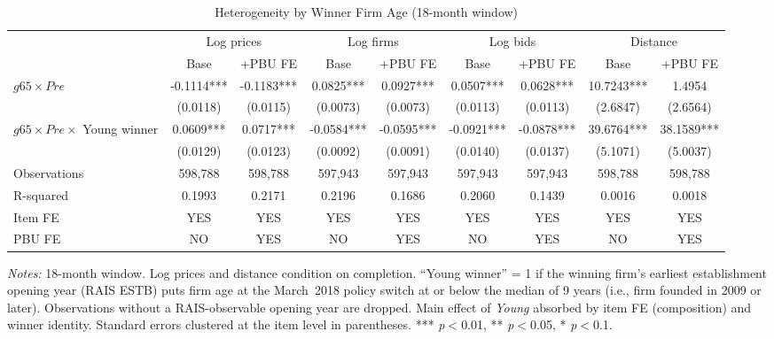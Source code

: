 \begin{table}[htbp]
\centering
\caption{Heterogeneity by Winner Firm Age (18-month window)}
\label{tab:firm_age}
\begin{adjustbox}{max width=\textwidth}
\begin{threeparttable}
\small
\begin{tabular}{lcccccccc}
\toprule
 & \multicolumn{2}{c}{Log prices} & \multicolumn{2}{c}{Log firms}
 & \multicolumn{2}{c}{Log bids} & \multicolumn{2}{c}{Distance} \\
\cmidrule(lr){2-3} \cmidrule(lr){4-5} \cmidrule(lr){6-7} \cmidrule(lr){8-9}
 & Base & +PBU FE & Base & +PBU FE & Base & +PBU FE & Base & +PBU FE \\
\midrule
$g65 \times Pre$ & -0.1114*** & -0.1183*** & 0.0825*** & 0.0927*** & 0.0507*** & 0.0628*** & 10.7243*** & 1.4954 \\
 & (0.0118) & (0.0115) & (0.0073) & (0.0073) & (0.0113) & (0.0113) & (2.6847) & (2.6564) \\
$g65 \times Pre \times$ Young winner & 0.0609*** & 0.0717*** & -0.0584*** & -0.0595*** & -0.0921*** & -0.0878*** & 39.6764*** & 38.1589*** \\
 & (0.0129) & (0.0123) & (0.0092) & (0.0091) & (0.0140) & (0.0137) & (5.1071) & (5.0037) \\
\midrule
Observations & 598,788 & 598,788 & 597,943 & 597,943 & 597,943 & 597,943 & 598,788 & 598,788 \\
R-squared & 0.1993 & 0.2171 & 0.2196 & 0.1686 & 0.2060 & 0.1439 & 0.0016 & 0.0018 \\
Item FE & YES & YES & YES & YES & YES & YES & YES & YES \\
PBU FE & NO & YES & NO & YES & NO & YES & NO & YES \\
\bottomrule
\end{tabular}
\begin{tablenotes}
\small
\item \textit{Notes:} 18-month window. Log prices and distance condition on completion.
``Young winner'' = 1 if the winning firm's earliest establishment opening year
(RAIS ESTB) puts firm age at the March~2018 policy switch at or below the median
of 9 years (i.e., firm founded in 2009 or later).
Observations without a RAIS-observable opening year are dropped.
Main effect of \textit{Young} absorbed by item FE (composition) and winner identity.
Standard errors clustered at the item level in parentheses.
*** \textit{p}$<$0.01, ** \textit{p}$<$0.05, * \textit{p}$<$0.1.
\end{tablenotes}
\end{threeparttable}
\end{adjustbox}
\end{table}
